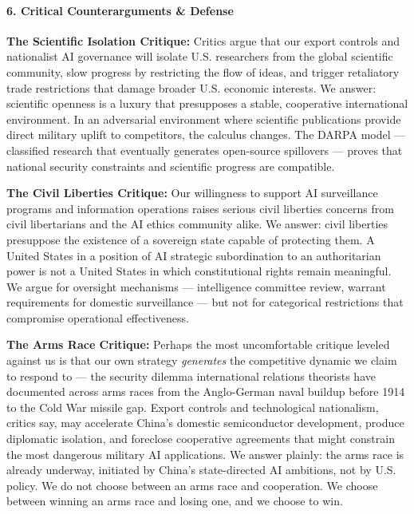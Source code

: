 \paragraph{6. Critical Counterarguments \&
Defense}\label{critical-counterarguments-defense-21}

\textbf{The Scientific Isolation Critique:} Critics argue that our
export controls and nationalist AI governance will isolate U.S.
researchers from the global scientific community, slow progress by
restricting the flow of ideas, and trigger retaliatory trade
restrictions that damage broader U.S. economic interests. We answer:
scientific openness is a luxury that presupposes a stable, cooperative
international environment. In an adversarial environment where
scientific publications provide direct military uplift to competitors,
the calculus changes. The DARPA model --- classified research that
eventually generates open-source spillovers --- proves that national
security constraints and scientific progress are compatible.

\textbf{The Civil Liberties Critique:} Our willingness to support AI
surveillance programs and information operations raises serious civil
liberties concerns from civil libertarians and the AI ethics community
alike. We answer: civil liberties presuppose the existence of a
sovereign state capable of protecting them. A United States in a
position of AI strategic subordination to an authoritarian power is not
a United States in which constitutional rights remain meaningful. We
argue for oversight mechanisms --- intelligence committee review,
warrant requirements for domestic surveillance --- but not for
categorical restrictions that compromise operational effectiveness.

\textbf{The Arms Race Critique:} Perhaps the most uncomfortable critique
leveled against us is that our own strategy \emph{generates} the
competitive dynamic we claim to respond to --- the security dilemma
international relations theorists have documented across arms races from
the Anglo-German naval buildup before 1914 to the Cold War missile gap.
Export controls and technological nationalism, critics say, may
accelerate China's domestic semiconductor development, produce
diplomatic isolation, and foreclose cooperative agreements that might
constrain the most dangerous military AI applications. We answer
plainly: the arms race is already underway, initiated by China's
state-directed AI ambitions, not by U.S. policy. We do not choose
between an arms race and cooperation. We choose between winning an arms
race and losing one, and we choose to win.

